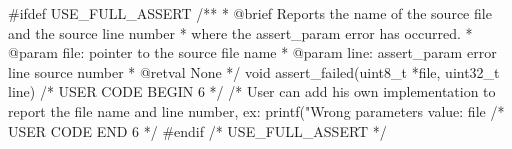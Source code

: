 #ifdef  USE_FULL_ASSERT
/**
  * @brief  Reports the name of the source file and the source line number
  *         where the assert_param error has occurred.
  * @param  file: pointer to the source file name
  * @param  line: assert_param error line source number
  * @retval None
  */
void assert_failed(uint8_t *file, uint32_t line)
{
  /* USER CODE BEGIN 6 */
  /* User can add his own implementation to report the file name and line number,
     ex: printf("Wrong parameters value: file %
  /* USER CODE END 6 */
}
#endif /* USE_FULL_ASSERT */
